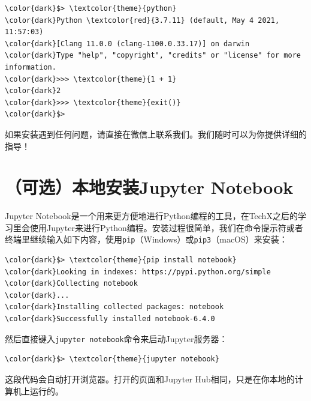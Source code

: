 \documentclass{article}
\begin{document}
\begin{Verbatim}[commandchars=\\\{\},xleftmargin=1.5cm]
\color{dark}$> \textcolor{theme}{python}
\color{dark}Python \textcolor{red}{3.7.11} (default, May 4 2021, 11:57:03)
\color{dark}[Clang 11.0.0 (clang-1100.0.33.17)] on darwin
\color{dark}Type "help", "copyright", "credits" or "license" for more information.
\color{dark}>>> \textcolor{theme}{1 + 1}
\color{dark}2
\color{dark}>>> \textcolor{theme}{exit()}
\color{dark}$>
\end{Verbatim}

如果安装遇到任何问题，请直接在微信上联系我们。我们随时可以为你提供详细的指导！

\section{（可选）本地安装Jupyter Notebook}
Jupyter Notebook是一个用来更方便地进行Python编程的工具，在TechX之后的学习里会使用Jupyter来进行Python编程。安装过程很简单，我们在命令提示符或者终端里继续输入如下内容，使用\texttt{pip}（Windows）或\texttt{pip3}（macOS）来安装：
\begin{Verbatim}[commandchars=\\\{\},xleftmargin=1.5cm]
\color{dark}$> \textcolor{theme}{pip install notebook}
\color{dark}Looking in indexes: https://pypi.python.org/simple
\color{dark}Collecting notebook
\color{dark}...
\color{dark}Installing collected packages: notebook
\color{dark}Successfully installed notebook-6.4.0
\end{Verbatim}

然后直接键入\texttt{jupyter notebook}命令来启动Jupyter服务器：
\begin{Verbatim}[commandchars=\\\{\},xleftmargin=1.5cm]
\color{dark}$> \textcolor{theme}{jupyter notebook}
\end{Verbatim}

这段代码会自动打开浏览器。打开的页面和Jupyter Hub相同，只是在你本地的计算机上运行的。
\end{document}
